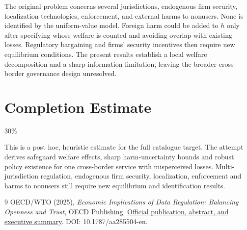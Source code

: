 \documentclass[11pt]{article}
\theoremstyle{definition}
\begin{document}
The original problem concerns several jurisdictions, endogenous firm security, localization technologies, enforcement, and external harms to nonusers. None is identified by the uniform-value model. Foreign harm could be added to $h$ only after specifying whose welfare is counted and avoiding overlap with existing losses. Regulatory bargaining and firms' security incentives then require new equilibrium conditions. The present results establish a local welfare decomposition and a sharp information limitation, leaving the broader cross-border governance design unresolved.

\section{Completion Estimate}
30\%

This is a post hoc, heuristic estimate for the full catalogue target.
The attempt derives safeguard welfare effects, sharp harm-uncertainty bounds and robust policy existence for one cross-border service with misperceived losses. Multi-jurisdiction regulation, endogenous firm security, localization, enforcement and harms to nonusers still require new equilibrium and identification results.

\begin{thebibliography}{9}
 OECD/WTO (2025), \emph{Economic Implications of Data Regulation: Balancing Openness and Trust}, OECD Publishing. \href{https://www.oecd.org/en/publications/economic-implications-of-data-regulation_aa285504-en.html}{Official publication, abstract, and executive summary}. DOI: 10.1787/aa285504-en.
\end{thebibliography}
\end{document}
